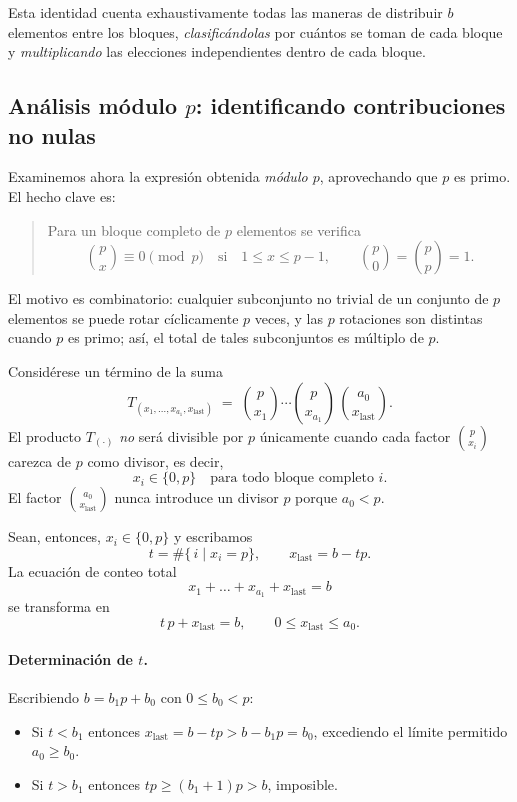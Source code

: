 \documentclass{article}
\begin{document}
Esta identidad cuenta exhaustivamente todas las maneras de distribuir
$b$ elementos entre los bloques, \emph{clasificándolas} por cuántos
se toman de cada bloque y \emph{multiplicando} las elecciones
independientes dentro de cada bloque.


\subsection*{Análisis módulo $p$: identificando contribuciones no nulas}

Examinemos ahora la expresión obtenida \emph{módulo $p$}, aprovechando que $p$ es primo.  
El hecho clave es:

\begin{quote}
Para un bloque completo de $p$ elementos se verifica
\[
  \binom{p}{x}\equiv 0 \pmod{p}
  \quad\text{si}\quad 1\le x\le p-1,
  \qquad
  \binom{p}{0}=\binom{p}{p}=1.
\]
\end{quote}

El motivo es combinatorio: cualquier subconjunto no trivial de un conjunto de
$p$ elementos se puede rotar cíclicamente $p$ veces, y las $p$ rotaciones son
distintas cuando $p$ es primo; así, el total de tales subconjuntos es múltiplo
de $p$.

Considérese un término de la suma
\[
  T_{(x_1,\dots,x_{a_1},x_{\text{last}})}
  \;=\;
  \binom{p}{x_1}\cdots\binom{p}{x_{a_1}}\,
  \binom{a_0}{x_{\text{last}}}.
\]
El producto $T_{(\cdot)}$ \emph{no} será divisible por $p$ únicamente cuando
cada factor $\binom{p}{x_i}$ carezca de $p$ como divisor, es decir,
\[
  x_i\in\{0,p\}\quad\text{para todo bloque completo }i.
\]
El factor $\binom{a_0}{x_{\text{last}}}$ nunca introduce un divisor $p$
porque $a_0<p$.

\medskip
\noindent
Sean, entonces, $x_i\in\{0,p\}$ y escribamos
\[
  t=\#\bigl\{\,i\;|\;x_i=p\bigr\},
  \qquad
  x_{\text{last}}=b-tp.
\]
La ecuación de conteo total
\[
  x_1+\dots+x_{a_1}+x_{\text{last}}=b
\]
se transforma en
\[
  t\,p + x_{\text{last}} = b,
  \qquad
  0\le x_{\text{last}}\le a_0.
\]

\paragraph{Determinación de $t$.}
Escribiendo $b=b_1p+b_0$ con $0\le b_0<p$:

\begin{itemize}
  \item Si $t<b_1$ entonces
        $x_{\text{last}} = b - tp > b - b_1p = b_0$,
        excediendo el límite permitido $a_0\ge b_0$.
  \item Si $t>b_1$ entonces $tp\ge(b_1+1)p>b$, imposible.
\end{itemize}
\end{document}
